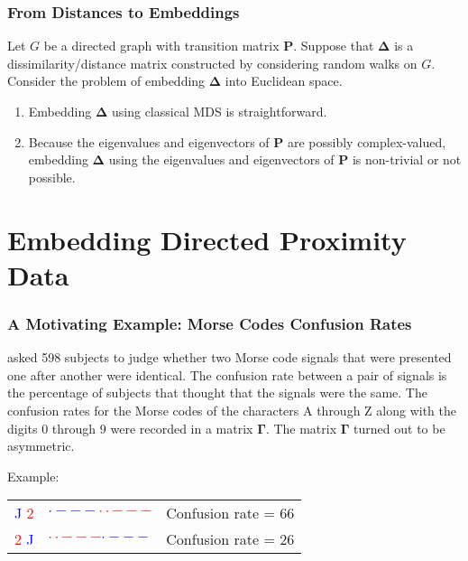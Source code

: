 \documentclass[professionalfonts, hyperref={pdfpagelabels=false,
  colorlinks=true, linkcolor=purple}]{beamer}
\begin{document}
\begin{frame}
  \frametitle{From Distances to Embeddings}
  Let $G$ be a directed graph with transition matrix
  $\mathbf{P}$. Suppose that $\bm{\Delta}$ is a dissimilarity/distance
  matrix constructed by considering random walks on $G$. Consider the
  problem of embedding $\bm{\Delta}$ into Euclidean space.
  \vskip10pt
  \begin{enumerate}
  \item Embedding $\bm{\Delta}$ using classical MDS is straightforward.
  \item \vskip10pt Because the eigenvalues and
    eigenvectors of $\mathbf{P}$ are possibly complex-valued,
    embedding $\bm{\Delta}$ using the eigenvalues and eigenvectors of
    $\mathbf{P}$ is non-trivial or not possible.
  \end{enumerate}
\end{frame}

\section{Embedding Directed Proximity Data}

\begin{frame}
  \frametitle{A Motivating Example: Morse Codes Confusion Rates}
  \cite{rothkopf57} asked 598 subjects to judge whether two Morse code
  signals that were presented one after another were identical. The
  confusion rate between a pair of signals is the percentage of
  subjects that thought that the signals were the same.  The confusion
  rates for the Morse codes of the characters A through Z along with
  the digits 0 through 9 were recorded in a matrix
  $\bm{\Gamma}$. The matrix $\bm{\Gamma}$ turned out to be
  asymmetric. 

  \vskip10pt Example:
  \vskip10pt
  \begin{tabular}{ccc}
  \textcolor{blue}{J} \textcolor{red}{2} & \textcolor{blue}{$
    \cdot - - -$}\textcolor{red}{$\cdot \cdot - - -$} & Confusion rate
  = 66 \\
  \textcolor{red}{2} \textcolor{blue}{J} & \textcolor{red}{$
    \cdot \cdot - - -$}\textcolor{blue}{$\cdot - - -$} & Confusion
  rate = 26
  \end{tabular}
\end{frame}
\end{document}
